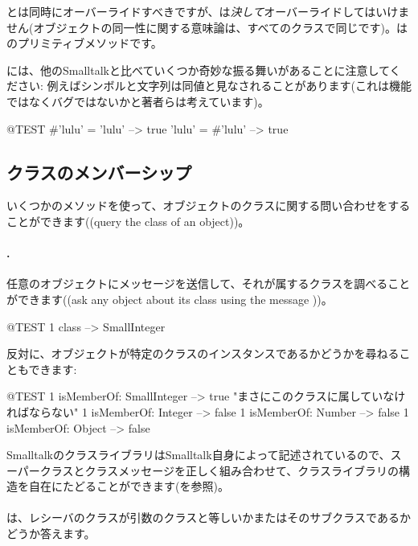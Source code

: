 \documentclass[a4paper,10pt,twoside]{book}
\begin{document}
\ct{=}とは同時にオーバーライドすべきですが、\ct{==}は\emph{決して}オーバーライドしてはいけません(オブジェクトの同一性に関する意味論は、すべてのクラスで同じです)。\ct{==}はのプリミティブメソッドです。

\pharo には、他のSmalltalkと比べていくつか奇妙な振る舞いがあることに注意してください: 例えばシンボルと文字列は同値と見なされることがあります(これは機能ではなくバグではないかと著者らは考えています)。

\begin{code}{@TEST}
#'lulu' = 'lulu' --> true
'lulu' = #'lulu' --> true
\end{code}


\subsection{クラスのメンバーシップ}
いくつかのメソッドを使って、オブジェクトのクラスに関する問い合わせをすることができます((query the class of an object))。

\paragraph{.} 任意のオブジェクトにメッセージを送信して、それが属するクラスを調べることができます((ask any object about its class using the message ))。
\begin{code}{@TEST}
1 class --> SmallInteger
\end{code}

反対に、オブジェクトが特定のクラスのインスタンスであるかどうかを尋ねることもできます:
\begin{code}{@TEST}
1 isMemberOf: SmallInteger --> true    "まさにこのクラスに属していなければならない"
1 isMemberOf: Integer          --> false
1 isMemberOf: Number        --> false
1 isMemberOf: Object           --> false
\end{code}

SmalltalkのクラスライブラリはSmalltalk自身によって記述されているので、スーパークラスとクラスメッセージを正しく組み合わせて、クラスライブラリの構造を自在にたどることができます(を参照)。

\paragraph{}
は、レシーバのクラスが引数のクラスと等しいかまたはそのサブクラスであるかどうか答えます。
\end{document}
